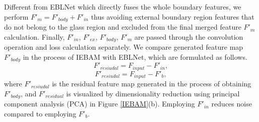 \documentclass[10pt,twocolumn,letterpaper]{article}
\begin{document}
Different from EBLNet which directly fuses the whole boundary features, we perform ${\textit{F}}{'}_{m}={\textit{F}}{'}_{body}+{\textit{F}}{'}_{in}$ thus avoiding external boundary region features that do not belong to the glass region and excluded from the final merged feature ${\textit{F}}{'}_{m}$ calculation. Finally, ${\textit{F}}{'}_{in}$, ${\textit{F}}{'}_{ex}$, ${\textit{F}}{'}_{body}$, ${\textit{F}}{'}_{m}$ are passed through the convolution operation and loss calculation separately.
We compare generated feature map ${\textit{F}}{'}_{body}$ in the process of IEBAM with EBLNet, which are formulated as follows. 
\begin{equation}
\label{eqn:02}
{\textit{F}}{'}_{resiudal}={\textit{F}}_{input}-{\textit{F}}{'}_{in},
\end{equation}
\begin{equation}
\label{eqn:02}
{\textit{F}}{'}_{resiudal}={\textit{F}}_{input}-{\textit{F}}{'}_{b},
\end{equation}
where ${\textit{F}}{'}_{resiudal}$ is the residual feature map generated in the process of obtaining ${\textit{F}}{'}_{body}$, and ${\textit{F}}{'}_{residual}$ is visualized by dimensionality reduction using principal component analysis (PCA) in Figure \ref{IEBAM}(b). Employing ${\textit{F}}{'}_{in}$ reduces noise compared to employing ${\textit{F}}{'}_{b}$.

\end{document}
